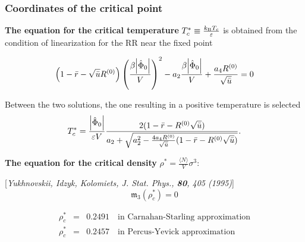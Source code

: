 \documentclass[8pt]{beamer}
\begin{document}
	\begin{frame}
		\frametitle{Coordinates of the critical point}
		
		\textbf{The equation for the critical temperature} $T_c^* \equiv \frac{k_{{\rm B}}T_c}{\varepsilon}$  is obtained from the condition of linearization for the RR near the fixed point
		
		\begin{equation*}
			\left(1 - \bar{r} - \sqrt{\bar{u}}R^{(0)}\right) \left(\frac{\beta\abs{\hat{\Phi}_0}}{V}\right)^2 - a_2\frac{\beta\abs{\hat{\Phi}_0}}{V} + \frac{a_4 R^{(0)}}{\sqrt{\bar{u}}} = 0
		\end{equation*}
		
		Between the two solutions, the one resulting in a positive temperature is selected
		\begin{equation*}
			\label{eq:T_c}
			T^*_c = \frac{\abs{\hat{\Phi}_0}}{\varepsilon V}
			\frac
			{2(1 - \bar{r} - R^{(0)}\sqrt{\bar{u}})}
			{a_2 + \sqrt{a_2^2 - \frac{4 a_4 R^{(0)}}{\sqrt{\bar{u}}} (1 - \bar{r} - R^{(0)}\sqrt{\bar{u}}) } }.
		\end{equation*}
		
		\textbf{The equation for the critical density} $\rho^*=\frac{\langle N \rangle}{V}\sigma^3$:
		
		[\textit{Yukhnovskii, Idzyk, Kolomiets, J. Stat. Phys., \textbf{80}, 405 (1995)}]
		\begin{equation*}
			\mathfrak{m}_3(\rho^*_c) = 0 
		\end{equation*}
		
		\begin{eqnarray*}
			\rho^*_c & = & 0.2491 \quad \text{in Carnahan-Starling approximation}
			\\
			\rho^*_c & = & 0.2457 \quad \text{in Percus-Yevick approximation}
		\end{eqnarray*}
	\end{frame}
	
\end{document}
